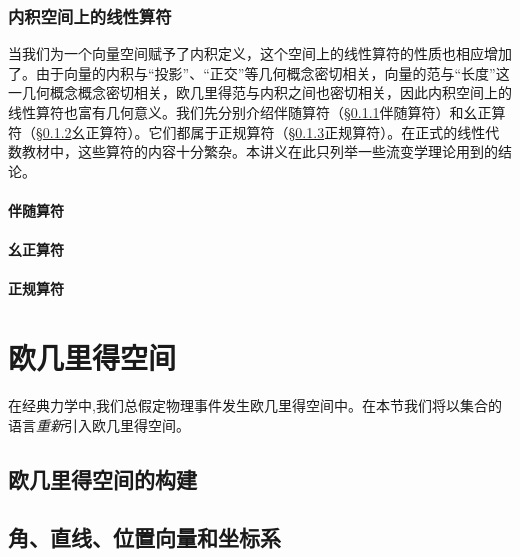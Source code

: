 \documentclass[zihao=-4,linespread=1.5,a4paper,heading=true,twoside]{ctexbook}
\theoremstyle{definition}
\theoremstyle{plain}
\begin{document}
\subsection{内积空间上的线性算符}\label{sec:II.2.4.2}
当我们为一个向量空间赋予了内积定义，这个空间上的线性算符的性质也相应增加了。由于向量的内积与“投影”、“正交”等几何概念密切相关，向量的范与“长度”这一几何概念概念密切相关，欧几里得范与内积之间也密切相关，因此内积空间上的线性算符也富有几何意义。我们先分别介绍伴随算符（\S \ref{sec:II.2.4.2_adjoint}伴随算符）和幺正算符（\S \ref{sec:II.2.4.2_unitary}幺正算符）。它们都属于正规算符（\S \ref{sec:II.2.4.2_normal}正规算符）。在正式的线性代数教材中，这些算符的内容十分繁杂。本讲义在此只列举一些流变学理论用到的结论。

\subsubsection{伴随算符}\label{sec:II.2.4.2_adjoint}

\subsubsection{幺正算符}\label{sec:II.2.4.2_unitary}

\subsubsection{正规算符}\label{sec:II.2.4.2_normal}




\chapter{欧几里得空间}
在经典力学中,我们总假定物理事件发生欧几里得空间中。在本节我们将以集合的语言\emph{重新}引入欧几里得空间。
\section{欧几里得空间的构建}\label{sec:II.3.1}


\section{角、直线、位置向量和坐标系}\label{sec:II.3.2}

\end{document}
